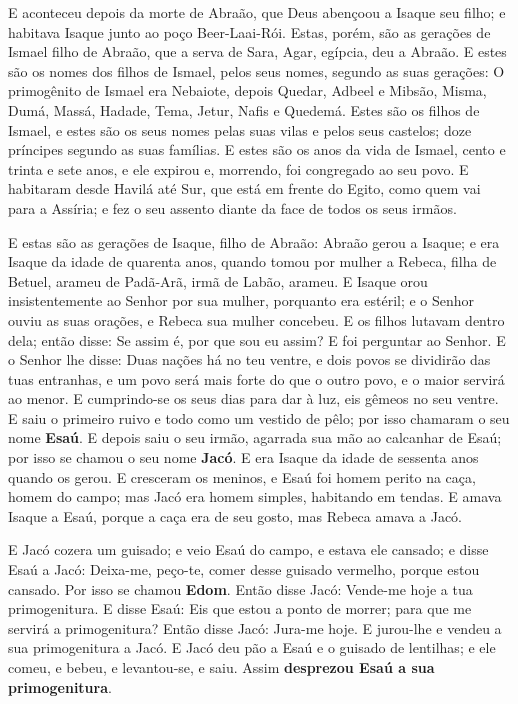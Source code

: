 E aconteceu depois da morte de Abraão, que Deus abençoou a Isaque
seu filho; e habitava Isaque junto ao poço Beer-Laai-Rói.
Estas, porém, são as gerações de Ismael filho de Abraão, que
a serva de Sara, Agar, egípcia, deu a Abraão. E estes são os
nomes dos filhos de Ismael, pelos seus nomes, segundo as suas
gerações: O primogênito de Ismael era Nebaiote, depois Quedar,
Adbeel e Mibsão, Misma, Dumá, Massá, Hadade, Tema,
Jetur, Nafis e Quedemá. Estes são os filhos de Ismael, e
estes são os seus nomes pelas suas vilas e pelos seus castelos; doze
príncipes segundo as suas famílias. E estes são os anos da
vida de Ismael, cento e trinta e sete anos, e ele expirou e,
morrendo, foi congregado ao seu povo. E habitaram desde
Havilá até Sur, que está em frente do Egito, como quem vai para a
Assíria; e fez o seu assento diante da face de todos os seus irmãos.

E estas são as gerações de Isaque, filho de Abraão: Abraão gerou
a Isaque; e era Isaque da idade de quarenta anos, quando
tomou por mulher a Rebeca, filha de Betuel, arameu de Padã-Arã, irmã
de Labão, arameu. E Isaque orou insistentemente ao Senhor por
sua mulher, porquanto era estéril; e o Senhor ouviu as suas orações,
e Rebeca sua mulher concebeu. E os filhos lutavam dentro
dela; então disse: Se assim é, por que sou eu assim? E foi perguntar
ao Senhor. E o Senhor lhe disse: Duas nações há no teu
ventre, e dois povos se dividirão das tuas entranhas, e um povo será
mais forte do que o outro povo, e o maior servirá ao menor. E
cumprindo-se os seus dias para dar à luz, eis gêmeos no seu ventre.
E saiu o primeiro ruivo e todo como um vestido de pêlo; por
isso chamaram o seu nome \textbf{Esaú}. E depois saiu o seu
irmão, agarrada sua mão ao calcanhar de Esaú; por isso se chamou o
seu nome \textbf{Jacó}. E era Isaque da idade de sessenta anos
quando os gerou. E cresceram os meninos, e Esaú foi homem
perito na caça, homem do campo; mas Jacó era homem simples,
habitando em tendas. E amava Isaque a Esaú, porque a caça era
de seu gosto, mas Rebeca amava a Jacó.

E Jacó cozera um guisado; e veio Esaú do campo, e estava ele
cansado; e disse Esaú a Jacó: Deixa-me, peço-te, comer desse
guisado vermelho, porque estou cansado. Por isso se chamou
\textbf{Edom}. Então disse Jacó: Vende-me hoje a tua
primogenitura. E disse Esaú: Eis que estou a ponto de morrer;
para que me servirá a primogenitura? Então disse Jacó:
Jura-me hoje. E jurou-lhe e vendeu a sua primogenitura a Jacó.
E Jacó deu pão a Esaú e o guisado de lentilhas; e ele comeu,
e bebeu, e levantou-se, e saiu. Assim \textbf{desprezou Esaú a sua
primogenitura}.

